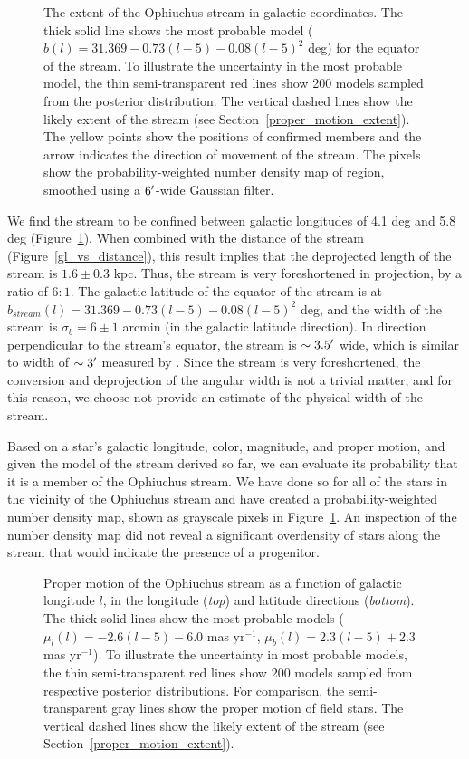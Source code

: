 \documentclass[iop]{emulateapj}
\begin{document}
\begin{figure}
\caption{
The extent of the Ophiuchus stream in galactic coordinates. The thick solid line
shows the most probable model ($b(l)=31.369-0.73(l-5)-0.08(l-5)^2$ deg) for the
equator of the stream. To illustrate the uncertainty in the most probable
model, the thin semi-transparent red lines show 200 models sampled from the
posterior distribution. The vertical dashed lines show the likely extent of the
stream (see Section~\ref{proper_motion_extent}). The yellow points show the
positions of confirmed members and the arrow indicates the direction of movement
of the stream. The pixels show the probability-weighted number density map of
region, smoothed using a $6\mbox{$^\prime$}$-wide Gaussian filter.
\label{gl_vs_gb_track}}
\end{figure}

We find the stream to be confined between galactic longitudes of 4.1 deg and 5.8
deg (Figure~\ref{gl_vs_gb_track}). When combined with the distance of the
stream (Figure~\ref{gl_vs_distance}), this result implies that the
deprojected length of the stream is $1.6\pm0.3$ kpc. Thus, the stream is very
foreshortened in projection, by a ratio of $6:1$. The galactic latitude of the
equator of the stream is at $b_{stream}(l) = 31.369 - 0.73(l-5) - 0.08(l-5)^2$
deg, and the width of the stream is $\sigma_b=6\pm1$ arcmin (in the galactic
latitude direction). In direction perpendicular to the stream's equator, the
stream is $\sim3.5\mbox{$^\prime$}$ wide, which is similar to width of $\sim3\mbox{$^\prime$}$
measured by \citet{ber14b}. Since the stream is very foreshortened, the
conversion and deprojection of the angular width is not a trivial matter, and
for this reason, we choose not provide an estimate of the physical width of the 
stream.


Based on a star's galactic longitude, color, magnitude, and proper motion, and
given the model of the stream derived so far, we can evaluate its probability
that it is a member of the Ophiuchus stream. We have done so for all of the
stars in the vicinity of the Ophiuchus stream and have created a
probability-weighted number density map, shown as grayscale pixels in
Figure~\ref{gl_vs_gb_track}. An inspection of the number density map did
not reveal a significant overdensity of stars along the stream that would
indicate the presence of a progenitor.

\begin{figure}
\caption{
Proper motion of the Ophiuchus stream as a function of galactic longitude $l$,
in the longitude ({\em top}) and latitude directions ({\em bottom}). The thick
solid lines show the most probable models ($\mu_l(l)=-2.6(l-5)-6.0$ mas
yr$^{-1}$, $\mu_b(l)=2.3(l-5)+2.3$ mas yr$^{-1}$). To illustrate the uncertainty
in most probable models, the thin semi-transparent red lines show 200 models
sampled from respective posterior distributions. For comparison, the
semi-transparent gray lines show the proper motion of field stars. The vertical 
dashed lines show the likely extent of the stream (see
Section~\ref{proper_motion_extent}).
\label{gl_vs_pm}}
\end{figure}
\end{document}
